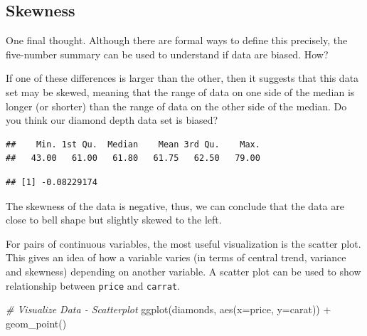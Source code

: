 \documentclass[
]{book}
\newenvironment{Shaded}{\begin{snugshade}}{\end{snugshade}}
\newcommand{\AttributeTok}[1]{\textcolor[rgb]{0.77,0.63,0.00}{#1}}
\newcommand{\CommentTok}[1]{\textcolor[rgb]{0.56,0.35,0.01}{\textit{#1}}}
\newcommand{\FunctionTok}[1]{\textcolor[rgb]{0.00,0.00,0.00}{#1}}
\newcommand{\NormalTok}[1]{#1}
\newcommand{\SpecialCharTok}[1]{\textcolor[rgb]{0.00,0.00,0.00}{#1}}
\begin{document}
\hypertarget{skewness}{%
\subsection{Skewness}\label{skewness}}

One final thought. Although there are formal ways to define this precisely, the five-number summary can be used to understand if data are biased. How?

If one of these differences is larger than the other, then it suggests that this data set may be skewed, meaning that the range of data on one side of the median is longer (or shorter) than the range of data on the other side of the median. Do you think our diamond depth data set is biased?

\begin{Shaded}
\end{Shaded}

\begin{verbatim}
##    Min. 1st Qu.  Median    Mean 3rd Qu.    Max. 
##   43.00   61.00   61.80   61.75   62.50   79.00
\end{verbatim}

\begin{Shaded}
\end{Shaded}

\begin{verbatim}
## [1] -0.08229174
\end{verbatim}

The skewness of the data is negative, thus, we can conclude that the data are close to bell shape but slightly skewed to the left.

For pairs of continuous variables, the most useful visualization is the scatter plot. This gives an idea of how a variable varies (in terms of central trend, variance and skewness) depending on another variable. A scatter plot can be used to show relationship between \texttt{price} and \texttt{carrat}.

\begin{Shaded}
\begin{Highlighting}[]
\CommentTok{\# Visualize Data {-} Scatterplot}
\FunctionTok{ggplot}\NormalTok{(diamonds, }\FunctionTok{aes}\NormalTok{(}\AttributeTok{x=}\NormalTok{price, }\AttributeTok{y=}\NormalTok{carat)) }\SpecialCharTok{+} \FunctionTok{geom\_point}\NormalTok{()}
\end{Highlighting}
\end{Shaded}
\end{document}
